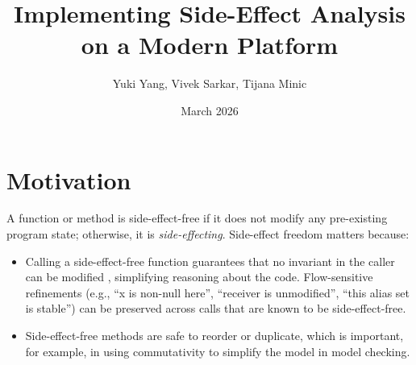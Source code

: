 \documentclass{article}
\title{Implementing Side-Effect Analysis on a Modern Platform}
\author{Yuki Yang, Vivek Sarkar, Tijana Minic}
\date{March 2026}
\begin{document}
\maketitle



\section{Motivation}


A function or method is side-effect-free if it does not modify any pre-existing program state; otherwise, it is \emph{side-effecting}. 
Side-effect freedom matters because: 
\begin{itemize}
\item Calling a side-effect-free function guarantees that no invariant in the caller can be modified \cite{salcianu2004combined}, simplifying reasoning about the code. Flow-sensitive refinements (e.g., “x is non-null here”, “receiver is unmodified”, “this alias set is stable”) can be preserved across calls that are known to be side-effect-free.
\item Side-effect-free methods are safe to reorder or duplicate, which is important, for example, in using commutativity to simplify the model in model checking.
\end{itemize}
\end{document}
